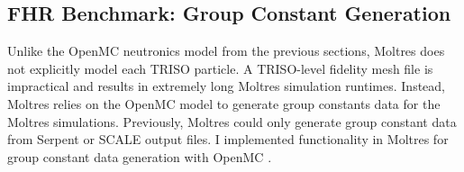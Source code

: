 \subsection{FHR Benchmark: Group Constant Generation}
\label{sec:fhr-bm-group-constant}
Unlike the OpenMC neutronics model from the previous sections, Moltres does not explicitly 
model each \gls{TRISO} particle. 
A TRISO-level fidelity mesh file is impractical and results in extremely long Moltres 
simulation runtimes.
Instead, Moltres relies on the OpenMC model to generate group constants data
for the Moltres simulations. 
Previously, Moltres could only generate group constant data from Serpent 
\cite{leppanen_serpent_2014} or SCALE \cite{bucholz_scale:_1982} output files. 
I implemented functionality in Moltres for group constant data generation with 
OpenMC \cite{lindsay_moltres_2017}. 

